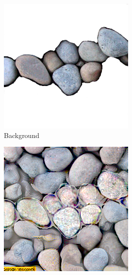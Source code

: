 \begin{figure}[]
\begin{subfigure}{\textwidth}
\begin{subfigure}{0.24\textwidth}
            \includegraphics[width=\textwidth]{images/04-experiment01/pebbles/some_bg.jpg}
            \caption{Background}
            \label{fig:ex01-pebbles-1000steps-some_bg}
        \end{subfigure}
        \hfill
        \begin{subfigure}{0.24\textwidth}
            \centering
            \includegraphics[width=\textwidth]{images/04-experiment01/pebbles/1000/some_im.jpg}

\end{subfigure}
\end{subfigure}
\end{figure}
